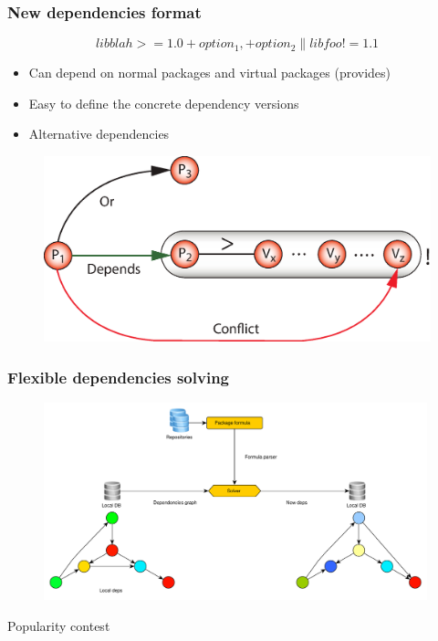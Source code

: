 \documentclass{beamer}
\begin{document}
\begin{frame}
\frametitle{New dependencies format}
\large{\[libblah >= 1.0 +option_1, +option_2 \| libfoo != 1.1\]}
\begin{itemize}
  \item Can depend on normal packages and virtual packages (provides)
  \item Easy to define the concrete dependency versions
  \item Alternative dependencies
\end{itemize}
\begin{figure}[h!]
  \centering
  \includegraphics[height=0.3\textheight]{q6.eps}
\end{figure}
\end{frame}

\begin{frame}
\frametitle{Flexible dependencies solving}
\begin{figure}[h!]
  \centering
  \includegraphics[width=0.99\textwidth]{flex_deps.pdf}
\end{figure}
\end{frame}

\begin{frame}
\begin{center}
\huge{Popularity contest}
\end{center}
\end{frame}
\end{document}
